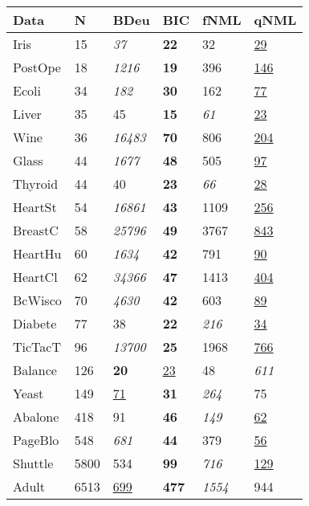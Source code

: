 \begin{tabular}{llllll}
\toprule
    Data &     N &             BDeu &             BIC &           fNML &             qNML \\
\midrule
    Iris &    15 &      \textit{37} &     \textbf{22} &             32 &   \underline{29} \\
 PostOpe &    18 &    \textit{1216} &     \textbf{19} &            396 &  \underline{146} \\
   Ecoli &    34 &     \textit{182} &     \textbf{30} &            162 &   \underline{77} \\
   Liver &    35 &               45 &     \textbf{15} &    \textit{61} &   \underline{23} \\
    Wine &    36 &   \textit{16483} &     \textbf{70} &            806 &  \underline{204} \\
   Glass &    44 &    \textit{1677} &     \textbf{48} &            505 &   \underline{97} \\
 Thyroid &    44 &               40 &     \textbf{23} &    \textit{66} &   \underline{28} \\
 HeartSt &    54 &   \textit{16861} &     \textbf{43} &           1109 &  \underline{256} \\
 BreastC &    58 &   \textit{25796} &     \textbf{49} &           3767 &  \underline{843} \\
 HeartHu &    60 &    \textit{1634} &     \textbf{42} &            791 &   \underline{90} \\
 HeartCl &    62 &   \textit{34366} &     \textbf{47} &           1413 &  \underline{404} \\
 BcWisco &    70 &    \textit{4630} &     \textbf{42} &            603 &   \underline{89} \\
 Diabete &    77 &               38 &     \textbf{22} &   \textit{216} &   \underline{34} \\
 TicTacT &    96 &   \textit{13700} &     \textbf{25} &           1968 &  \underline{766} \\
 Balance &   126 &      \textbf{20} &  \underline{23} &             48 &     \textit{611} \\
   Yeast &   149 &   \underline{71} &     \textbf{31} &   \textit{264} &               75 \\
 Abalone &   418 &               91 &     \textbf{46} &   \textit{149} &   \underline{62} \\
 PageBlo &   548 &     \textit{681} &     \textbf{44} &            379 &   \underline{56} \\
 Shuttle &  5800 &              534 &     \textbf{99} &   \textit{716} &  \underline{129} \\
   Adult &  6513 &  \underline{699} &    \textbf{477} &  \textit{1554} &              944 \\
\bottomrule
\end{tabular}
